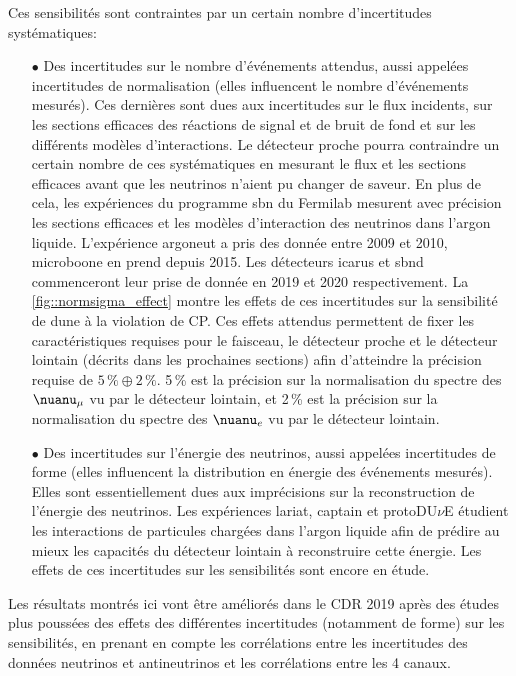         Ces sensibilités sont contraintes par un certain nombre d'incertitudes systématiques:
        \begin{itemize}
          \item[$\bullet$] Des incertitudes sur le nombre d'événements attendus, aussi appelées incertitudes de normalisation (elles influencent le nombre d'événements mesurés). Ces dernières sont dues aux incertitudes sur le flux incidents, sur les sections efficaces des réactions de signal et de bruit de fond et sur les différents modèles d'interactions. Le détecteur proche pourra contraindre un certain nombre de ces systématiques en mesurant le flux et les sections efficaces avant que les neutrinos n'aient pu changer de saveur. En plus de cela, les expériences du programme \gls{sbn} du Fermilab mesurent avec précision les sections efficaces et les modèles d'interaction des neutrinos dans l'argon liquide. L'expérience \gls{argoneut}\cite{Anderson2012} a pris des donnée entre 2009 et 2010, \gls{microboone}\cite{Collaboration2016} en prend depuis 2015. Les détecteurs \gls{icarus}\cite{Farnese2011} et \gls{sbnd}\cite{Tufanli2017} commenceront leur prise de donnée en 2019 et 2020 respectivement. La \autoref{fig::normsigma_effect} montre les effets de ces incertitudes sur la sensibilité de \gls{dune} à la violation de CP. Ces effets attendus permettent de fixer les caractéristiques requises pour le faisceau, le détecteur proche et le détecteur lointain (décrits dans les prochaines sections) afin d'atteindre la précision requise de $5\,\%\oplus2\,\%$. 5\,\% est la précision sur la normalisation du spectre des $\nuanu_{\mu}$ vu par le détecteur lointain, et 2\,\% est la précision sur la normalisation du spectre des $\nuanu_e$ vu par le détecteur lointain.
          \item[$\bullet$] Des incertitudes sur l'énergie des neutrinos, aussi appelées incertitudes de forme (elles influencent la distribution en énergie des événements mesurés). Elles sont essentiellement dues aux imprécisions sur la reconstruction de l'énergie des neutrinos. Les expériences \gls{lariat}\cite{Nutini2017}, \gls{captain}\cite{Bian2015} et protoDU$\nu$E\cite{Manenti2017} étudient les interactions de particules chargées dans l'argon liquide afin de prédire au mieux les capacités du détecteur lointain à reconstruire cette énergie. Les effets de ces incertitudes sur les sensibilités sont encore en étude.
        \end{itemize}
         Les résultats montrés ici vont être améliorés dans le CDR 2019 après des études plus poussées des effets des différentes incertitudes (notamment de forme) sur les sensibilités, en prenant en compte les corrélations entre les incertitudes des données neutrinos et antineutrinos et les corrélations entre les 4 canaux.

